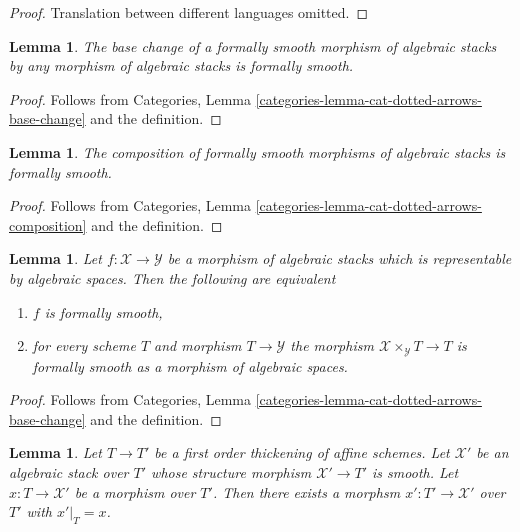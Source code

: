 \documentclass{stacks-project}
\theoremstyle{plain}
\newtheorem{lemma}[subsection]{Lemma}
\theoremstyle{definition}
\theoremstyle{remark}
\numberwithin{equation}{subsection}
\begin{document}
\begin{proof}
Translation between different languages omitted.
\end{proof}

\begin{lemma}
\label{lemma-base-change-formal-smoothness}
The base change of a formally smooth morphism of algebraic stacks
by any morphism of algebraic stacks is formally smooth.
\end{lemma}

\begin{proof}
Follows from
Categories, Lemma \ref{categories-lemma-cat-dotted-arrows-base-change}
and the definition.
\end{proof}

\begin{lemma}
\label{lemma-composition-formal-smoothness}
The composition of formally smooth morphisms of algebraic stacks
is formally smooth.
\end{lemma}

\begin{proof}
Follows from
Categories, Lemma \ref{categories-lemma-cat-dotted-arrows-composition}
and the definition.
\end{proof}

\begin{lemma}
\label{lemma-formal-smoothness-representable}
Let $f : \mathcal{X} \to \mathcal{Y}$ be a morphism of algebraic stacks
which is representable by algebraic spaces. Then the following are equivalent
\begin{enumerate}
\item $f$ is formally smooth,
\item for every scheme $T$ and morphism $T \to \mathcal{Y}$
the morphism $\mathcal{X} \times_\mathcal{Y} T \to T$
is formally smooth as a morphism of algebraic spaces.
\end{enumerate}
\end{lemma}

\begin{proof}
Follows from
Categories, Lemma \ref{categories-lemma-cat-dotted-arrows-base-change}
and the definition.
\end{proof}

\begin{lemma}
\label{lemma-lift-to-smooth}
Let $T \to T'$ be a first order thickening of affine schemes.
Let $\mathcal{X}'$ be an algebraic stack over $T'$
whose structure morphism $\mathcal{X}' \to T'$ is smooth.
Let $x : T \to \mathcal{X}'$ be a morphism
over $T'$. Then there exists a morphsm $x' : T' \to \mathcal{X}'$
over $T'$ with $x'|_T = x$.
\end{lemma}
\end{document}
